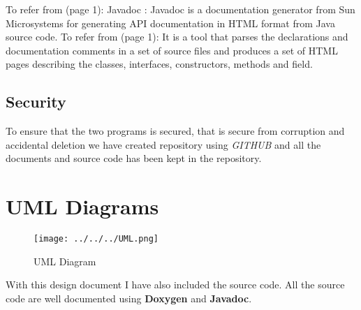 \documentclass{article}
\begin{document}
To refer from \cite{Wikipedia_Javadoc}(page 1):  Javadoc : Javadoc is a documentation generator from Sun Microsystems  for generating API documentation in HTML format from Java source code. To refer from \cite{Javadoc}(page 1):  It is a tool that parses the declarations and documentation comments in a set of source files and produces a set of HTML pages describing the classes, interfaces, constructors, methods and field. 



\subsection{Security}
\label{sec:secur}

To ensure that the two programs is secured, that is secure from corruption and accidental deletion we have created repository using \emph{GITHUB} and all the documents and source code has been kept in the repository.

\section{UML Diagrams}
\label{sec:uml}

\begin{figure}[hbtp]
\centering
\texttt{[image: ../../../UML.png]}
\caption{UML Diagram}
\end{figure}

With this design document I have also included the source code. All the source code are well documented using {\bf Doxygen} and {\bf Javadoc}.




\end{document}
